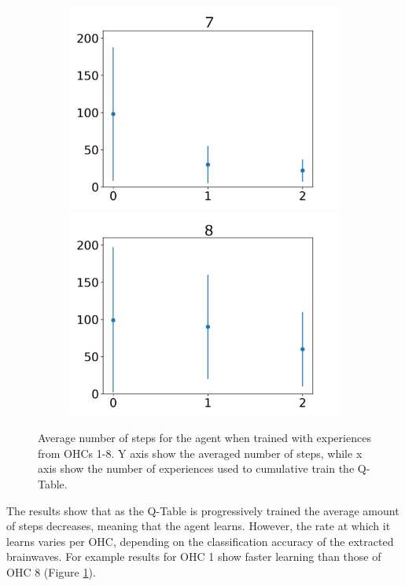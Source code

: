 \documentclass[journal]{IEEEtran}
\begin{document}
{{\begin{figure}[h!]
\begin{subfigure}{0.5\textwidth}
  \centering
  \includegraphics[scale=0.27]{Images/Average_steps/g.png} 
  \includegraphics[scale=0.27]{Images/Average_steps/h.png} 
\end{subfigure}
\caption{Average number of steps for the agent when trained with experiences from OHCs 1-8. Y axis show the averaged number of steps, while x axis show the number of experiences used to cumulative train the Q-Table.}
\label{fig:avg_steps}
\end{figure}


The results show that as the Q-Table is progressively trained the average amount of steps decreases, meaning that the agent learns. However, the rate at which it learns varies per OHC, depending on the classification accuracy of the extracted brainwaves.  For example results for OHC 1 show faster learning than those of OHC 8 (Figure \ref{fig:avg_steps}).

}}
\end{document}

